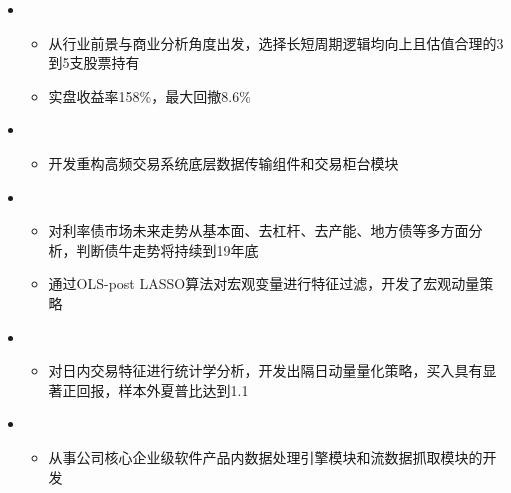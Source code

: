   \begin{itemize}[leftmargin=*]
    \item
      {\small
      \begin{itemize}
        \item 从行业前景与商业分析角度出发，选择长短周期逻辑均向上且估值合理的3到5支股票持有
        \item 实盘收益率158\%，最大回撤8.6\%
      \end{itemize}
      }
    \item
      {\small
      \begin{itemize}
        \item 开发重构高频交易系统底层数据传输组件和交易柜台模块
      \end{itemize}
      }
    \item
      {\small
      \begin{itemize}
        \item 对利率债市场未来走势从基本面、去杠杆、去产能、地方债等多方面分析，判断债牛走势将持续到19年底
        \item 通过OLS-post LASSO算法对宏观变量进行特征过滤，开发了宏观动量策略
      \end{itemize}
      }
    \item
      {\small
      \begin{itemize}
        \item 对日内交易特征进行统计学分析，开发出隔日动量量化策略，买入具有显著正回报，样本外夏普比达到1.1
      \end{itemize}
      }
    \item
      {\small
      \begin{itemize}
        \item 从事公司核心企业级软件产品内数据处理引擎模块和流数据抓取模块的开发
      \end{itemize}
      }
  \end{itemize}